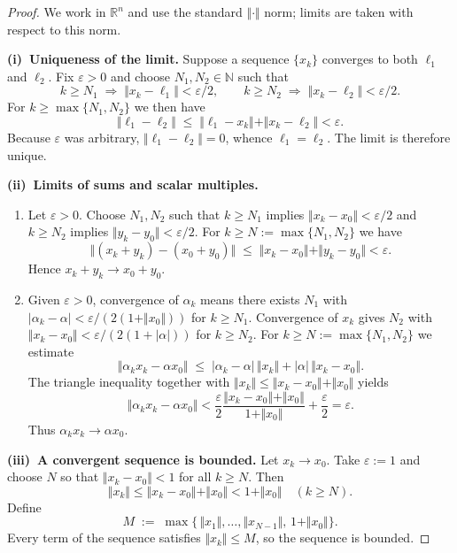\documentclass[10pt]{extarticle}
\begin{document}
\begin{proof}
    We work in $\mathbb R^{n}$ and use the standard $\Vert\cdot\Vert$ norm; limits are taken with respect to this norm.

    \medskip
    \textbf{(i)~Uniqueness of the limit.}  Suppose a sequence $\{x_{k}\}$ converges to both $\ell_{1}$ and $\ell_{2}$.  Fix $\varepsilon>0$ and choose $N_{1},N_{2}\in\mathbb N$ such that
    \[
        k\ge N_{1}\;\Longrightarrow\;\Vert x_{k}-\ell_{1}\Vert<\varepsilon/2,
        \qquad
        k\ge N_{2}\;\Longrightarrow\;\Vert x_{k}-\ell_{2}\Vert<\varepsilon/2.
    \]
    For $k\ge\max\{N_{1},N_{2}\}$ we then have
    \[
        \Vert\ell_{1}-\ell_{2}\Vert\;\le\;\Vert\ell_{1}-x_{k}\Vert+\Vert x_{k}-\ell_{2}\Vert<\varepsilon.
    \]
    Because $\varepsilon$ was arbitrary, $\Vert\ell_{1}-\ell_{2}\Vert=0$, whence $\ell_{1}=\ell_{2}$.  The limit is therefore unique.

    \medskip
    \textbf{(ii)~Limits of sums and scalar multiples.}
    \begin{enumerate}
        \item  Let $\varepsilon>0$.  Choose $N_{1},N_{2}$ such that $k\ge N_{1}$ implies $\Vert x_{k}-x_{0}\Vert<\varepsilon/2$ and $k\ge N_{2}$ implies $\Vert y_{k}-y_{0}\Vert<\varepsilon/2$.  For $k\ge N:=\max\{N_{1},N_{2}\}$ we have
              \[
                  \Vert(x_{k}+y_{k})-(x_{0}+y_{0})\Vert\;\le\;\Vert x_{k}-x_{0}\Vert+\Vert y_{k}-y_{0}\Vert<\varepsilon.
              \]
              Hence $x_{k}+y_{k}\to x_{0}+y_{0}$.

        \item  Given $\varepsilon>0$, convergence of $\alpha_{k}$ means there exists $N_{1}$ with $|\alpha_{k}-\alpha|<\varepsilon/(2(1+\Vert x_{0}\Vert))$ for $k\ge N_{1}$.  Convergence of $x_{k}$ gives $N_{2}$ with $\Vert x_{k}-x_{0}\Vert<\varepsilon/(2(1+|\alpha|))$ for $k\ge N_{2}$.  For $k\ge N:=\max\{N_{1},N_{2}\}$ we estimate
              \[
                  \Vert \alpha_{k}x_{k}-\alpha x_{0} \Vert\;\le\;|\alpha_{k}-\alpha|\,\Vert x_{k}\Vert+|\alpha|\,\Vert x_{k}-x_{0}\Vert.
              \]
              The triangle inequality together with $\Vert x_{k}\Vert\le\Vert x_{k}-x_{0}\Vert+\Vert x_{0}\Vert$ yields
              \[
                  \Vert \alpha_{k}x_{k}-\alpha x_{0} \Vert<\frac{\varepsilon}{2}\frac{\Vert x_{k}-x_{0}\Vert+\Vert x_{0}\Vert}{1+\Vert x_{0}\Vert}+\frac{\varepsilon}{2}=\varepsilon.
              \]
              Thus $\alpha_{k}x_{k}\to\alpha x_{0}$.
    \end{enumerate}

    \medskip
    \textbf{(iii)~A convergent sequence is bounded.}  Let $x_{k}\to x_{0}$.  Take $\varepsilon:=1$ and choose $N$ so that $\Vert x_{k}-x_{0}\Vert<1$ for all $k\ge N$.  Then
    \[
        \Vert x_{k}\Vert\le\Vert x_{k}-x_{0}\Vert+\Vert x_{0}\Vert<1+\Vert x_{0}\Vert\quad(k\ge N).
    \]
    Define
    \[
        M\;:=\;\max\bigl\{\,\Vert x_{1}\Vert,\ldots,\Vert x_{N-1}\Vert,\,1+\Vert x_{0}\Vert\bigr\}.
    \]
    Every term of the sequence satisfies $\Vert x_{k}\Vert\le M$, so the sequence is bounded.
\end{proof}
\end{document}
